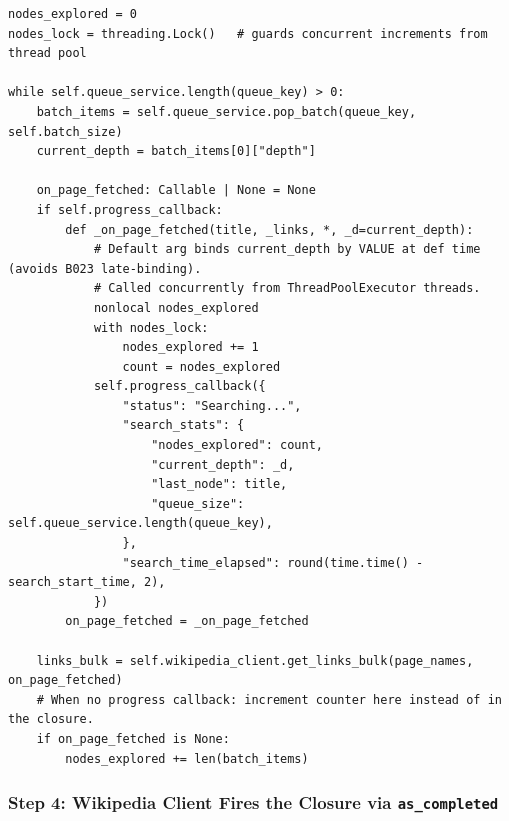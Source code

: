 \documentclass[11pt,a4paper]{article}
\begin{document}
\begin{lstlisting}[caption=pathfinding.py -- on\_page\_fetched Closure (RedisBasedBFS)]
nodes_explored = 0
nodes_lock = threading.Lock()   # guards concurrent increments from thread pool

while self.queue_service.length(queue_key) > 0:
    batch_items = self.queue_service.pop_batch(queue_key, self.batch_size)
    current_depth = batch_items[0]["depth"]

    on_page_fetched: Callable | None = None
    if self.progress_callback:
        def _on_page_fetched(title, _links, *, _d=current_depth):
            # Default arg binds current_depth by VALUE at def time (avoids B023 late-binding).
            # Called concurrently from ThreadPoolExecutor threads.
            nonlocal nodes_explored
            with nodes_lock:
                nodes_explored += 1
                count = nodes_explored
            self.progress_callback({
                "status": "Searching...",
                "search_stats": {
                    "nodes_explored": count,
                    "current_depth": _d,
                    "last_node": title,
                    "queue_size": self.queue_service.length(queue_key),
                },
                "search_time_elapsed": round(time.time() - search_start_time, 2),
            })
        on_page_fetched = _on_page_fetched

    links_bulk = self.wikipedia_client.get_links_bulk(page_names, on_page_fetched)
    # When no progress callback: increment counter here instead of in the closure.
    if on_page_fetched is None:
        nodes_explored += len(batch_items)
\end{lstlisting}

\subsubsection{Step 4: Wikipedia Client Fires the Closure via \texttt{as\_completed}}
\end{document}
